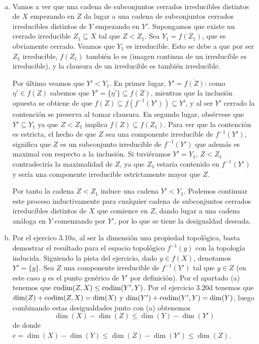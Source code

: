 \documentclass[twoside]{article}
\begin{document}
\begin{solucion}\
\begin{enumerate}[(a)]
\item Vamos a ver que una cadena de subconjuntos cerrados irreducibles distintos de $X$ empezando en $Z$ da lugar a una cadena de subconjuntos cerrados irreducibles distintos de $Y$ empezando en $Y'$. Supongamos que existe un cerrado irreducible $Z_1\subseteq X$ tal que $Z<Z_1$. Sea $Y_1=\overline{f(Z_1)}$, que es obviamente cerrado. Veamos que $Y_1$ es irreducible. Esto se debe a que por ser $Z_1$ irreducible, $f(Z_1)$ también lo es (imagen continua de un irreducible es irreducible), y la clausura de un irreducible es también irreducible. 

Por último veamos que $Y'<Y_1$. En primer lugar, $Y'=\overline{f(Z)}$: como $\eta'\in f(Z)$ sabemos que $Y'=\overline{\{\eta'\}}\subseteq\overline{f(Z)}$, mientras que la inclusión opuesta se obtiene de que $f(Z)\subseteq f(f^{-1}(Y'))\subseteq Y'$, y al ser $Y'$ cerrado la contención se preserva al tomar clausura. En segundo lugar, obsérvese que $Y'\subseteq Y_1$ ya que $Z<Z_1$ implica $f(Z)\subseteq f(Z_1)$. Para ver que la contención es estricta, el hecho de que $Z$ sea una componente irreducible de $f^{-1}(Y')$, significa que $Z$ es un subconjunto irreducible de $f^{-1}(Y')$ que además es maximal con respecto a la inclusión. Si tuviéramos $Y'=Y_1$, $Z<Z_1$ contradeciría la maximalidad de $Z$, ya que $Z_1$ estaría contenido en $f^{-1}(Y')$ y sería una componente irreducible estrictamente mayor que $Z$.

Por tanto la cadena $Z<Z_1$ induce una cadena $Y'<Y_1$. Podemos continuar este proceso inductivamente para cualquier cadena de subconjuntos cerrados irreducibles distintos de $X$ que comience en $Z$, dando lugar a una cadena análoga en $Y$ comenzando por $Y'$, por lo que se tiene la desigualdad deseada. 

\item Por el ejercico 3.10a, al ser la dimensión una propiedad topológica, basta demostrar el resultado para el espacio topológico $f^{-1}(y)$ con la topología inducida. Siguiendo la pista del ejercicio, dado $y\in f(X)$, denotamos $Y'=\overline{\{y\}}$. Sea $Z$ una componente irreducible de $f^{-1}(Y')$ tal que $y\in Z$ (en este caso $y$ es el punto genérico de $Y'$ por definición). Por el apartado (a) tenemos que $\operatorname{codim}(Z,X)\leq\operatorname{codim}(Y',Y)$. Por el ejercicio 3.20d tenemos que $\dim(Z)+\operatorname{codim}(Z,X)=\dim(X)$ y $\dim(Y')+\operatorname{codim}(Y',Y)=\dim(Y)$, luego combinando estas desigualdades junto con (a) obtenemos
\[
\dim(X)-\dim(Z)\leq\dim(Y)-\dim(Y')
\]
de donde $e=\dim(X)-\dim(Y)\leq \dim(Z)-\dim(Y')\leq\dim(Z)$. 


\end{enumerate}
\end{solucion}
\end{document}
